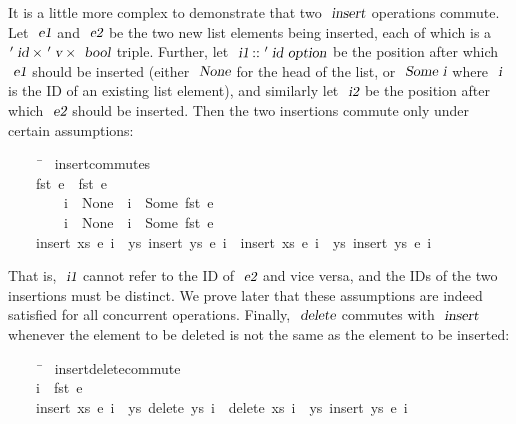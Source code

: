 It is a little more complex to demonstrate that two $\isa{insert}$ operations commute.
Let $\isa{e1}$ and $\isa{e2}$ be the two new list elements being inserted, each of which is a $\isacharprime\isa{id} \mathbin{\isasymtimes} \isacharprime\isa{v} \mathbin{\isasymtimes} \isa{bool}$ triple.
Further, let $\isa{i1} \mathbin{\isacharcolon\isacharcolon} \isacharprime\isa{id option}$ be the position after which $\isa{e1}$ should be inserted (either $\isa{None}$ for the head of the list, or $\isa{Some i}$ where $\isa{i}$ is the ID of an existing list element), and similarly let $\isa{i2}$ be the position after which $\isa{e2}$ should be inserted.
Then the two insertions commute only under certain assumptions:
\begin{isabelle}
~~~~\ \=\kill
{}\ insert{\isacharunderscore}commutes{\isacharcolon}\\
~~~~\>{\isachardoublequoteopen}fst\ e{}\ {\isasymnoteq}\ fst\ e{}{\isachardoublequoteclose}\\
~~~~~~~~\>{\isachardoublequoteopen}i{}\ {\isacharequal}\ None\ {\isasymor}\ i{}\ {\isasymnoteq}\ Some\ {\isacharparenleft}fst\ e{}{\isacharparenright}{\isachardoublequoteclose}\\
~~~~~~~~\>{\isachardoublequoteopen}i{}\ {\isacharequal}\ None\ {\isasymor}\ i{}\ {\isasymnoteq}\ Some\ {\isacharparenleft}fst\ e{}{\isacharparenright}{\isachardoublequoteclose}\\
~~~~\>{\isachardoublequoteopen}insert\ xs\ e{}\ i{}\ {\isasymbind}\ {\isacharparenleft}{\isasymlambda}ys{\isachardot}\ insert\ ys\ e{}\ i{}{\isacharparenright}\ {\isacharequal}\ insert\ xs\ e{}\ i{}\ {\isasymbind}\ {\isacharparenleft}{\isasymlambda}ys{\isachardot}\ insert\ ys\ e{}\ i{}{\isacharparenright}{\isachardoublequoteclose}
\end{isabelle}
\noindent
That is, $\isa{i1}$ cannot refer to the ID of $\isa{e2}$ and vice versa, and the IDs of the two insertions must be distinct.
We prove later that these assumptions are indeed satisfied for all concurrent operations.
Finally, $\isa{delete}$ commutes with $\isa{insert}$ whenever the element to be deleted is not the same as the element to be inserted:
\begin{isabelle}
~~~~\ \=\kill
{}\ insert{\isacharunderscore}delete{\isacharunderscore}commute{\isacharcolon}\\
~~~~\>{\isachardoublequoteopen}i{}\ {\isasymnoteq}\ fst\ e{\isachardoublequoteclose}\\
~~~~\>{\isachardoublequoteopen}insert\ xs\ e\ i{}\ {\isasymbind}\ {\isacharparenleft}{\isasymlambda}ys{\isachardot}\ delete\ ys\ i{}{\isacharparenright}\ {\isacharequal}\ delete\ xs\ i{}\ {\isasymbind}\ {\isacharparenleft}{\isasymlambda}ys{\isachardot}\ insert\ ys\ e\ i{}{\isacharparenright}{\isachardoublequoteclose}
\end{isabelle}

